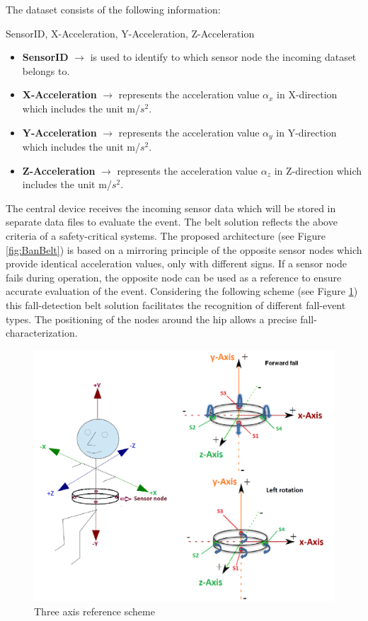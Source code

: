 \documentclass[review]{elsarticle}
\begin{document}
 The dataset consists of the following information: 
\begin{center}
 SensorID, X-Acceleration, Y-Acceleration, Z-Acceleration
\end{center}
\begin{itemize}
	\item \textbf{SensorID} $\rightarrow$ is used to identify to which sensor node the incoming dataset belongs to.
	\item \textbf{X-Acceleration} $\rightarrow$ represents the acceleration value $\alpha_{x}$ in X-direction which includes the unit m/$s^2$.
	\item \textbf{Y-Acceleration} $\rightarrow$ represents the acceleration value $\alpha_{y}$ in Y-direction which includes the unit m/$s^2$.
	\item \textbf{Z-Acceleration} $\rightarrow$ represents the acceleration value $\alpha_{z}$ in Z-direction which includes the unit m/$s^2$.
\end{itemize}
The central device receives the incoming sensor data which will be stored in separate data files to evaluate the event. 
The belt solution reflects the above criteria of a safety-critical systems. The proposed architecture (see Figure \ref{fig:BanBelt}) is based on a mirroring principle of the opposite sensor nodes which provide identical acceleration values, only with different signs. If a sensor node fails during operation, the opposite node can be used as a reference to ensure accurate evaluation of the event.  Considering the following scheme (see Figure \ref{fig:ReferenceScheme}) this fall-detection belt solution facilitates the recognition of different fall-event types. The positioning of the nodes around the hip allows a precise fall-characterization.
\begin{figure}[!ht]
	\centering
	\includegraphics[scale=0.31]{images/axis}
	\caption[Three axis reference scheme]{Three axis reference scheme \cite{LaBlunda.2016,LuigiMasterThesis}}
	\label{fig:ReferenceScheme}
\end{figure}
\end{document}
